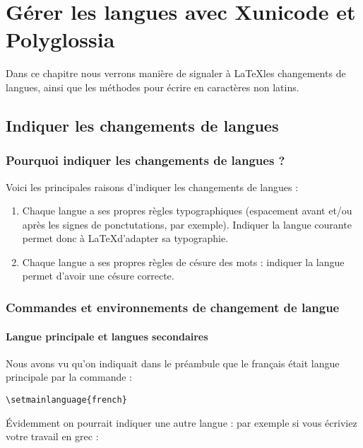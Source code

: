 \chapter{Gérer les langues avec Xunicode et Polyglossia}\label{i18n}

\begin{prealable}
	Dans ce chapitre nous verrons manière de signaler à \LaTeX les changements de langues, ainsi que les méthodes pour écrire en caractères non latins.
\end{prealable}

\section{Indiquer les changements de langues}

\subsection{Pourquoi indiquer les changements de langues ?}

Voici les principales raisons d'indiquer les changements de langues :
\begin{enumerate}
\item Chaque langue  a ses propres règles typographiques (espacement avant et/ou après les signes de ponctutations, par exemple). Indiquer la langue courante permet donc à \LaTeX d'adapter sa typographie.
\item Chaque langue a ses propres règles de césure des mots : indiquer la langue permet d'avoir une césure correcte.
\end{enumerate}


\subsection{Commandes et environnements de changement de langue}

\subsubsection{Langue principale et langues secondaires}

Nous avons vu qu'on indiquait dans le préambule que le français était langue principale par la commande : 

\begin{verbatim}
\setmainlanguage{french}
\end{verbatim}

Évidemment on pourrait indiquer une autre langue :  par exemple si vous écriviez votre travail en grec :

